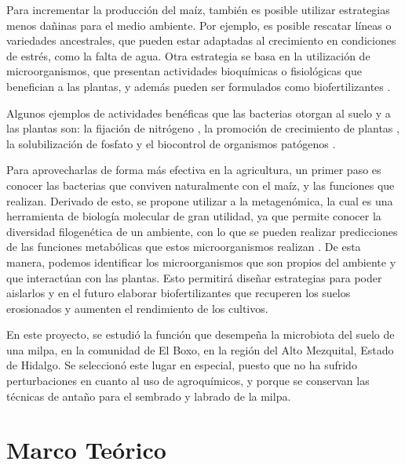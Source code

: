 \documentclass[12pt,letterpaper,oneside]{report}
\begin{document}
\par
Para incrementar la producción del maíz, también es posible utilizar estrategias menos dañinas para el medio ambiente. Por ejemplo, es posible rescatar líneas o variedades ancestrales, que pueden estar adaptadas al crecimiento en condiciones de estrés, como la falta de agua. Otra estrategia se basa en la utilización de microorganismos, que presentan actividades bioquímicas o fisiológicas que benefician a las plantas, y además pueden ser formulados como biofertilizantes \autocite{Babu2017a,Saraf2013}.
\par
Algunos ejemplos de actividades benéficas que las bacterias otorgan al suelo y a las plantas son: la fijación de nitrógeno \autocite{Martins2017,Pii2015}, la promoción de crecimiento de plantas \autocite{Breedt2017,Compant2005}, la solubilización de fosfato \autocite{Babu2017b} y el biocontrol de organismos patógenos \autocite{Douriet-Gamez2017,Li2016}.
\par
Para aprovecharlas de forma más efectiva en la agricultura, un primer paso es conocer las bacterias que conviven naturalmente con el maíz, y las funciones que realizan. Derivado de esto, se propone utilizar a la metagenómica, la cual es una herramienta de biología molecular de gran utilidad, ya que permite conocer la diversidad filogenética de un ambiente, con lo que se pueden realizar predicciones de las funciones metabólicas que estos microorganismos realizan \autocite{Langille2013}. De esta manera, podemos identificar los microorganismos que son propios del ambiente y que interactúan con las plantas. Esto permitirá diseñar estrategias para poder aislarlos y en el futuro elaborar biofertilizantes que recuperen los suelos erosionados y aumenten el rendimiento de los cultivos.
\par
En este proyecto, se estudió la función que desempeña la microbiota del suelo de una milpa, en la comunidad de El Boxo, en la región del Alto Mezquital, Estado de Hidalgo. Se seleccionó este lugar en especial, puesto que no ha sufrido perturbaciones en cuanto al uso de agroquímicos, y porque se conservan las técnicas de antaño para el sembrado y labrado de la milpa.
\chapter{Marco Teórico}
\end{document}
